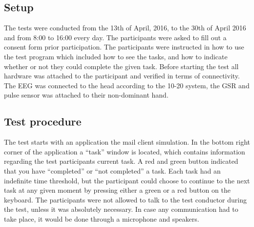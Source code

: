 \subsection{Setup}
The tests were conducted from the 13th of April, 2016, to the 30th of April 2016 and from 8:00 to 16:00 every day. 
The participants were asked to fill out a consent form prior participation. 
The participants were instructed in how to use the test program which included how to see the tasks, and how to indicate whether or not they could complete the given task. 
Before starting the test all hardware was attached to the participant and verified in terms of connectivity. 
The EEG was connected to the head according to the 10-20 system\cite{eeg_tech_10_20}, the GSR and pulse sensor was attached to their non-dominant hand. 

\subsection{Test procedure}
The test starts with an application the mail client simulation.
In the bottom right corner of the application a ``task'' window is located, which contains information regarding the test participants current task. 
A red and green button indicated that you have ``completed'' or ``not completed'' a task.  
Each task had an indefinite time threshold, but the participant could choose to continue to the next task at any given moment by pressing either a green or a red button on the keyboard. 
The participants were not allowed to talk to the test conductor during the test, unless it was absolutely necessary. 
In case any communication had to take place, it would be done through a microphone and speakers.
